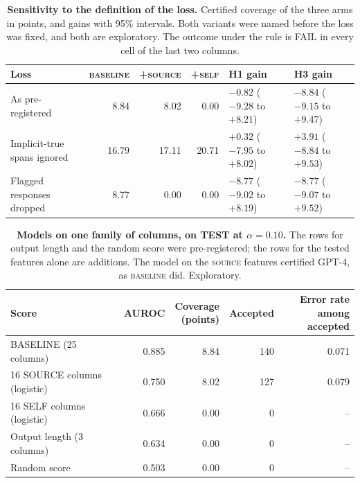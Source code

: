 \documentclass[11pt]{article}
\newcommand{\arm}[1]{\textsc{#1}}
\begin{document}
\begin{table}[h]
\centering
\small
\caption{\textbf{Sensitivity to the definition of the loss.} Certified coverage of the three arms in points, and gains with 95\% intervals. Both variants were named before the loss was fixed, and both are exploratory. The outcome under the rule is FAIL in every cell of the last two columns.}
\label{tab:loss}
\footnotesize
\setlength{\tabcolsep}{4.5pt}
\begin{tabular}{@{}lrrrll@{}}
\toprule
Loss & \arm{baseline} & \arm{+source} & \arm{+self} & H1 gain & H3 gain \\
\midrule
As pre-registered & 8.84 & 8.02 & 0.00 & $-0.82$ ($-9.28$ to $+8.21$) & $-8.84$ ($-9.15$ to $+9.47$) \\
Implicit-true spans ignored & 16.79 & 17.11 & 20.71 & $+0.32$ ($-7.95$ to $+8.02$) & $+3.91$ ($-8.84$ to $+9.53$) \\
Flagged responses dropped & 8.77 & 0.00 & 0.00 & $-8.77$ ($-9.02$ to $+8.19$) & $-8.77$ ($-9.07$ to $+9.52$) \\
\bottomrule
\end{tabular}
\end{table}

\begin{table}[h]
\centering
\small
\caption{\textbf{Models on one family of columns, on TEST at $\alpha = 0.10$.} The rows for output length and the random score were pre-registered; the rows for the tested features alone are additions. The model on the \arm{source} features certified GPT-4, as \arm{baseline} did. Exploratory.}
\label{tab:alone}
\begin{tabular}{@{}lrrrr@{}}
\toprule
Score & AUROC & \shortstack[r]{Coverage\\(points)} & Accepted & \shortstack[r]{Error rate\\among accepted} \\
\midrule
BASELINE (25 columns) & 0.885 & 8.84 & 140 & 0.071 \\
16 SOURCE columns (logistic) & 0.750 & 8.02 & 127 & 0.079 \\
16 SELF columns (logistic) & 0.666 & 0.00 & 0 & -- \\
Output length (3 columns) & 0.634 & 0.00 & 0 & -- \\
Random score & 0.503 & 0.00 & 0 & -- \\
\bottomrule
\end{tabular}
\end{table}
\end{document}
